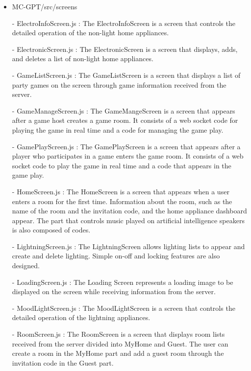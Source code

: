 \documentclass[conference]{IEEEtran}
\begin{document}
\begin{itemize}
                \item MC-GPT/src/screens
                    \item[-] ElectroInfoScreen.js : The ElectroInfoScreen is a screen that controls the detailed operation of the non-light home appliances.
                    \item[-] ElectronicScreen.js : The ElectronicScreen is a screen that displays, adds, and deletes a list of non-light home appliances. 
                    \item[-] GameListScreen.js : The GameListScreen is a screen that displays a list of party games on the screen through game information received from the server.
                    \item[-] GameManageScreen.js : The GameMangeScreen is a screen that appears after a game host creates a game room. It consists of a web socket code for playing the game in real time and a code for managing the game play.
                    \item[-] GamePlayScreen.js : The GamePlayScreen is a screen that appears after a player who participates in a game enters the game room. It consists of a web socket code to play the game in real time and a code that appears in the game play.
                    \item[-] HomeScreen.js : The HomeScreen is a screen that appears when a user enters a room for the first time. Information about the room, such as the name of the room and the invitation code, and the home appliance dashboard appear. The part that controls music played on artificial intelligence speakers is also composed of codes.
                    \item[-] LightningScreen.js : The LightningScreen allows lighting lists to appear and create and delete lighting. Simple on-off and locking features are also designed.
                    \item[-] LoadingScreen.js : The Loading Screen represents a loading image to be displayed on the screen while receiving information from the server.
                    \item[-] MoodLightScreen.js : The MoodLightScreen is a screen that controls the detailed operation of the lightning appliances.
                    \item[-] RoomScreen.js : The RoomScreen is a screen that displays room lists received from the server divided into MyHome and Guest. The user can create a room in the MyHome part and add a guest room through the invitation code in the Guest part.

\end{itemize}
\end{document}
